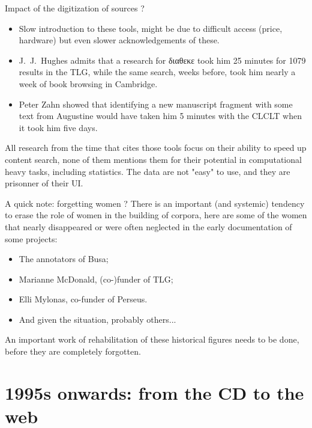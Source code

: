 \documentclass[aspectratio=169]{beamer}
\begin{document}
\begin{frame}{Impact of the digitization of sources ?}
    \begin{itemize}
        \item Slow introduction to these tools, might be due to difficult access (price, hardware) but even slower acknowledgements of these.
        \item J.~J.~Hughes admits that a research for διαθεκε took him 25 minutes for 1079 results in the TLG, while the same search, weeks before, took him nearly a week of book browsing in Cambridge.
        \item Peter Zahn showed that identifying a new manuscript fragment with some text from Augustine would have taken him 5 minutes with the CLCLT when it took him five days.
    \end{itemize}
    All research from the time that cites those tools focus on their ability to speed up content search, none of them mentions them for their potential in computational heavy tasks, including statistics. The data are not "easy" to use, and they are prisonner of their UI.
\end{frame}

\begin{frame}{A quick note: forgetting women ?}
    There is an important (and systemic) tendency to erase the role of women in the building of corpora, here are some of the women that nearly disappeared or were often neglected in the early documentation of some projects:
    \begin{itemize}
        \item The annotators of Busa;
        \item Marianne McDonald, (co-)funder of TLG;
        \item Elli Mylonas, co-funder of Perseus.
        \item And given the situation, probably others...
    \end{itemize}
    An important work of rehabilitation of these historical figures needs to be done, before they are completely forgotten.
\end{frame}

\section{1995s onwards: from the CD to the web}
\end{document}
